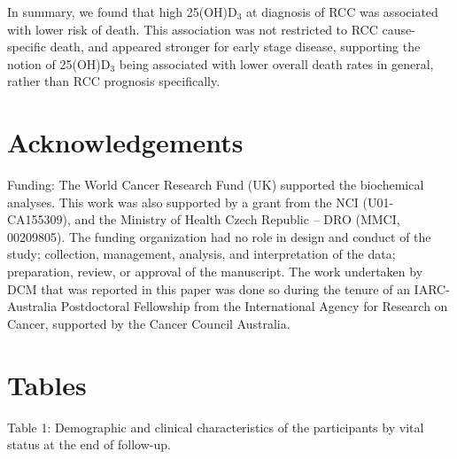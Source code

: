 \documentclass[a4paper,11pt]{article}
\begin{document}
In summary, we found that high 25(OH)D$_3$ at diagnosis of RCC was associated 
with lower risk of death. This association was not restricted to RCC 
cause-specific death, and appeared stronger for early stage disease, 
supporting the notion of 25(OH)D$_3$ being associated with lower overall death 
rates in general, rather than RCC prognosis specifically. 

\section*{Acknowledgements}
\noindent Funding:
The World Cancer Research Fund (UK) supported the biochemical analyses. This work was 
also supported by a grant from the NCI (U01-CA155309), and the Ministry of Health 
Czech Republic -- DRO (MMCI, 00209805). The funding organization had no role in 
design and conduct of the study; collection, management, analysis, and 
interpretation of the data; preparation, review, or approval of the manuscript. The 
work undertaken by DCM that was reported in this paper was done so during the tenure 
of an IARC-Australia Postdoctoral Fellowship from the International Agency for 
Research on Cancer, supported by the Cancer Council Australia. 

\clearpage




\clearpage
\section*{Tables}

\begin{table}
\small
\caption{Table 1: Demographic and clinical characteristics of the participants by 
vital status at the end of follow-up.}
\centering

\end{table}
\end{document}
